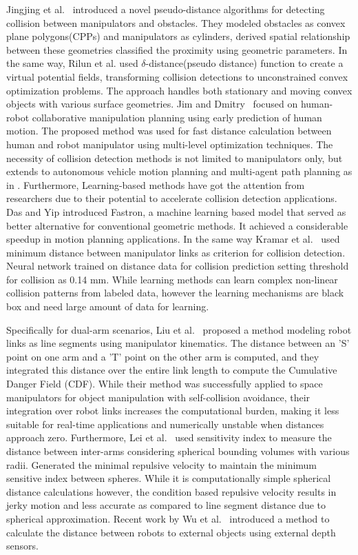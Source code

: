 \documentclass[10pt,twocolumn]{ICCAS}
\begin{document}
Jingjing et al.~\cite{xu2020pseudo} introduced a novel pseudo-distance algorithms for detecting collision between manipulators and obstacles. They modeled obstacles as convex plane polygons(CPPs) and manipulators as cylinders, derived spatial relationship between these geometries classified the proximity using geometric parameters. In the same way, Rilun et al.\cite{xia2024collision} used $\delta$-distance(pseudo distance) function to create a virtual potential fields, transforming collision detections to unconstrained convex optimization problems. The approach handles both stationary and moving convex objects with various surface geometries. Jim and Dmitry~\cite{mainprice2013human} focused on human-robot collaborative manipulation planning using early prediction of human motion. The proposed method was used for fast distance calculation between human and robot manipulator using multi-level optimization techniques. The necessity of collision detection methods is not limited to manipulators only, but extends to autonomous vehicle motion planning and multi-agent path planning as in \cite{iccas2} \cite{iccas1}. Furthermore, Learning-based methods have got the attention from researchers due to their potential to accelerate collision detection applications. Das and  Yip \cite{das2020learning} introduced Fastron, a machine learning based model that served as better alternative for conventional geometric methods. It achieved a considerable speedup in motion planning applications. In the same way Kramar et al.~\cite{kramar2022self} used minimum distance between manipulator links as criterion for collision detection. Neural network trained on distance data for collision prediction setting threshold for collision as 0.14 mm. While learning methods can learn complex non-linear collision patterns from labeled data, however the learning mechanisms are black box and need large amount of data for learning.

Specifically for dual-arm scenarios, Liu et al.~\cite{liu2018self} proposed a method modeling robot links as line segments using manipulator kinematics. The distance between an 'S' point on one arm and a 'T' point on the other arm is computed, and they integrated this distance over the entire link length to compute the Cumulative Danger Field (CDF). While their method was successfully applied to space manipulators for object manipulation with self-collision avoidance, their integration over robot links increases the computational burden, making it less suitable for real-time applications and numerically unstable when distances approach zero. Furthermore, Lei et al.~\cite{lei2020real} used sensitivity index to measure the distance between inter-arms considering spherical bounding volumes with various radii. Generated the minimal repulsive velocity to maintain the minimum sensitive index between spheres. While it is computationally simple spherical distance calculations however, the condition based repulsive velocity results in jerky motion and less accurate as compared to line segment distance due to spherical approximation. Recent work by Wu et al.~\cite{wu2025real} introduced a method to calculate the distance between robots to external objects using external depth sensors.
\end{document}
